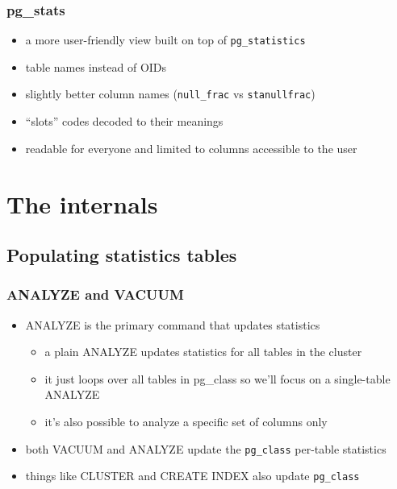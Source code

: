 \documentclass{beamer}
\begin{document}
\begin{frame}
  \frametitle{pg\_stats}

  \begin{itemize}
  \item a more \alert{user-friendly} view built on top of \texttt{pg\_statistics}
  \item \alert{table names} instead of OIDs
  \item slightly better \alert{column names} (\texttt{null\_frac} vs \texttt{stanullfrac})
  \item ``slots'' codes \alert{decoded} to their meanings
  \item \alert{readable for everyone} and limited to columns accessible to the user
  \end{itemize}
\end{frame}


\section{The internals}
\subsection{Populating statistics tables}

\begin{frame}
  \frametitle{ANALYZE and VACUUM}

  \begin{itemize}
  \item \alert{ANALYZE} is the primary command that updates statistics
    \begin{itemize}
    \item a plain ANALYZE updates statistics for \alert{all tables} in the cluster
    \item it just loops over all tables in pg\_class so we'll focus on a
      \alert{single-table} ANALYZE
    \item it's also possible to analyze a \alert{specific set of columns} only
    \end{itemize}
  \item both \alert{VACUUM} and \alert{ANALYZE} update the \texttt{pg\_class}
    per-table statistics
  \item things like \alert{CLUSTER} and \alert{CREATE INDEX} also update
    \texttt{pg\_class}
  \end{itemize}
\end{frame}
\end{document}

